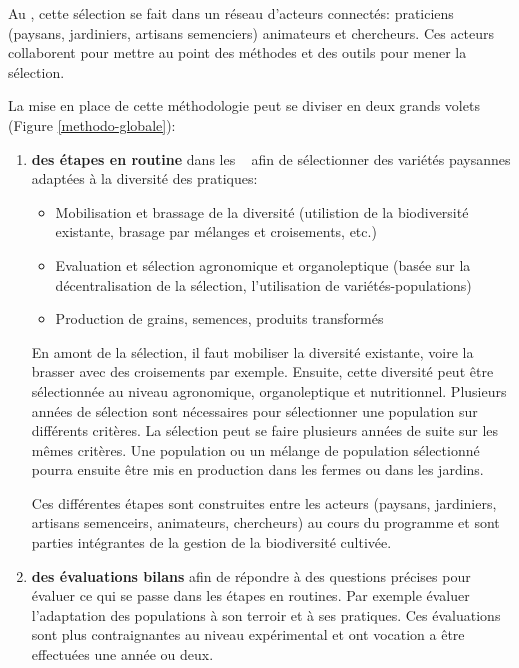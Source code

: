 Au \RSP, cette sélection se fait dans un réseau d’acteurs connectés: praticiens (paysans, jardiniers, artisans semenciers) animateurs et chercheurs.
Ces acteurs collaborent pour mettre au point des méthodes et des outils pour mener la sélection.

La mise en place de cette méthodologie peut se diviser en deux grands volets (Figure \ref{methodo-globale}):

\begin{enumerate}

\item \textbf{\color{mln-green} des étapes en routine} dans les \MSPs~ afin de sélectionner des variétés paysannes adaptées à la diversité des pratiques:

\begin{itemize}
\item Mobilisation et brassage de la diversité (utilistion de la biodiversité existante, brasage par mélanges et croisements, etc.)
\item Evaluation et sélection agronomique et organoleptique (basée sur la décentralisation de la sélection, l'utilisation de variétés-populations)
\item Production de grains, semences, produits transformés
\end{itemize}

En amont de la sélection, il faut mobiliser la diversité existante, voire la brasser avec des croisements par exemple.
Ensuite, cette diversité peut être sélectionnée au niveau agronomique, organoleptique et nutritionnel. 
Plusieurs années de sélection sont nécessaires pour sélectionner une population sur différents critères.
La sélection peut se faire plusieurs années de suite sur les mêmes critères.
Une population ou un mélange de population sélectionné pourra ensuite être mis en production dans les fermes ou dans les jardins.

Ces différentes étapes sont construites entre les acteurs (paysans, jardiniers, artisans semenceirs, animateurs, chercheurs) au cours du programme et sont parties intégrantes de la gestion de la biodiversité cultivée.


\item \textbf{\color{mln-green}des évaluations bilans} afin de répondre à des questions précises pour évaluer ce qui se passe dans les étapes en routines.
Par exemple évaluer l'adaptation des populations à son terroir et à ses pratiques.
Ces évaluations sont plus contraignantes au niveau expérimental et ont vocation a être effectuées une année ou deux.

\end{enumerate}



